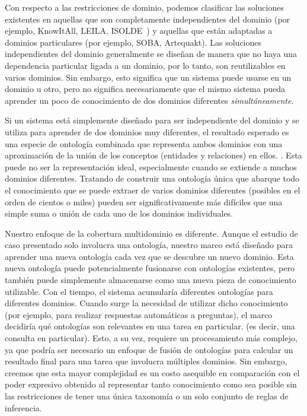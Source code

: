 Con respecto a las restricciones de dominio, podemos clasificar las soluciones existentes en aquellas que son completamente independientes del dominio (por ejemplo, KnowItAll, LEILA, ISOLDE~\cite{isolde}) y aquellas que están adaptadas
a dominios particulares (por ejemplo, SOBA, Artequakt). Las soluciones independientes del dominio generalmente se diseñan de manera que no haya una dependencia particular ligada a un dominio, por lo tanto, son reutilizables en varios dominios. Sin embargo, esto significa que un sistema puede usarse en un dominio u otro, pero no significa necesariamente que el mismo sistema pueda aprender un poco de conocimiento de dos dominios diferentes \emph{simultáneamente}.

Si un sistema está simplemente diseñado para ser independiente del dominio y se utiliza para aprender de dos dominios muy diferentes, el resultado esperado es una especie de ontología combinada que representa ambos dominios con una aproximación de la unión de los conceptos (entidades y relaciones) en ellos. . Esta puede no ser la representación ideal, especialmente cuando se extiende a muchos dominios diferentes. Tratando de construir una ontología única que abarque todo el conocimiento que se puede extraer de
varios dominios diferentes (posibles en el orden de cientos o miles) pueden ser significativamente más difíciles que una simple suma o unión de cada uno de los dominios individuales.

Nuestro enfoque de la cobertura multidominio es diferente. Aunque el estudio de caso presentado solo involucra una ontología, nuestro marco está diseñado para aprender una nueva ontología cada vez que se descubre un nuevo dominio. Esta nueva ontología puede potencialmente fusionarse con ontologías existentes, pero también puede simplemente almacenarse como una nueva pieza de conocimiento utilizable. Con el tiempo, el sistema acumularía diferentes ontologías para diferentes dominios.
Cuando surge la necesidad de utilizar dicho conocimiento (por ejemplo, para realizar respuestas automáticas a preguntas), el marco decidiría qué ontologías son relevantes en una tarea en particular. (es decir, una consulta en particular).
Esto, a su vez, requiere un procesamiento más complejo, ya que podría ser necesario un enfoque de fusión de ontologías para calcular un resultado final para una tarea que involucra múltiples dominios. Sin embargo, creemos que esta mayor complejidad es un costo asequible en comparación con el poder expresivo obtenido al representar tanto conocimiento como sea posible sin las restricciones de tener una única taxonomía o un solo conjunto de reglas de inferencia.

